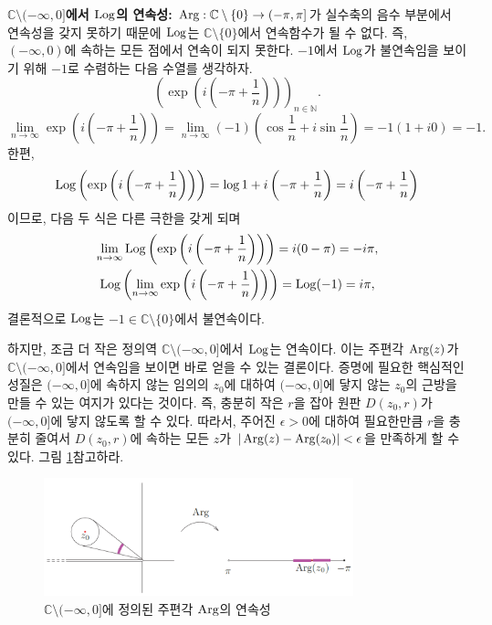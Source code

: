 {\bf $\mathbb C \setminus (-\infty, 0]$에서 $\mathop{\mathrm{Log}}$의 연속성: }
$\mathop{\mathrm{Arg}} : \mathbb C \setminus \{0\} \to (-\pi, \pi]$가 실수축의 음수 부분에서
연속성을 갖지 못하기 때문에 $\mathop{\mathrm{Log}}$는 $\mathbb C \setminus \{0\}$에서 연속함수가 될 수 없다.
즉, $(-\infty, 0)$에 속하는 모든 점에서 연속이 되지 못한다.
$-1$에서 $\mathop{\mathrm{Log}}$가 불연속임을 보이기 위해 $-1$로 수렴하는 다음 수열를 생각하자.
$$
\left( \exp \left( i \left( - \pi + \dfrac 1n \right) \right) \right)_{n\in\mathbb N}.
$$
$$
\lim_{n\to\infty} \exp \left( i \left( -\pi + \frac1n\right) \right) 
= \lim_{n\to\infty} (-1) \left(\cos \frac1n + i \sin \frac1n \right) 
= -1 (1+i0) = -1.
$$
한편,
$$
\mathop{\mathrm{Log}} \left( \exp \left( i \left( -\pi + \frac1n\right) \right) \right)
= \log 1 + i \left( - \pi + \displaystyle\frac1n \right) = i\left( - \pi + \displaystyle\frac1n \right)
$$
이므로, 다음 두 식은 다른 극한을 갖게 되며
\begin{gather*}
\lim_{n\to\infty}  \mathop{\mathrm{Log}} \left( \exp \left( i \left( -\pi + \frac1n\right) \right) \right)
= i(0 -\pi) = -i\pi, \\
\mathop{\mathrm{Log}} \left( \lim_{n\to\infty} \exp \left( i \left( -\pi + \frac1n\right) \right) \right)
= \mathop{\mathrm{Log}}(-1) = i\pi,
\end{gather*}
결론적으로 $\mathop{\mathrm{Log}}$는 $-1\in\mathbb C \setminus \{0\}$에서 불연속이다.

하지만, 조금 더 작은 정의역 $\mathbb C \setminus (-\infty, 0]$에서 
$\mathop{\mathrm{Log}}$는 연속이다.
이는 주편각 $\mathop{\mathrm{Arg}}(z)$가 $\mathbb C \setminus (-\infty, 0]$에서 연속임을 보이면
바로 얻을 수 있는 결론이다.
증명에 필요한 핵심적인 성질은
$(-\infty,0]$에 속하지 않는 임의의 $z_0$에 대하여
$(-\infty,0]$에 닿지 않는 $z_0$의 근방을 만들 수 있는 여지가 있다는 것이다.
즉, 충분히 작은 $r$을 잡아 원판 $D(z_0, r)$가 
$(-\infty,0]$에 닿지 않도록 할 수 있다.
따라서, 주어진 $\epsilon>0$에 대하여
필요한만큼 $r$을 충분히 줄여서
$D(z_0, r)$에 속하는 모든 $z$가 $|\mathop{\mathrm{Arg}}(z) - \mathop{\mathrm{Arg}}(z_0)|<\epsilon$을 만족하게 할 수 있다.
그림 \ref{fig-1-20}\을 참고하라.

\begin{figure}[!h]
\begin{center}
\includegraphics[width=0.8\textwidth]{./SaltChapter/figs/fig-1-20}
\end{center}
\caption{$\mathbb C\setminus (-\infty,0]$에 정의된 주편각 $\mathop{\mathrm{Arg}}$의 연속성}
\label{fig-1-20}
\end{figure}

